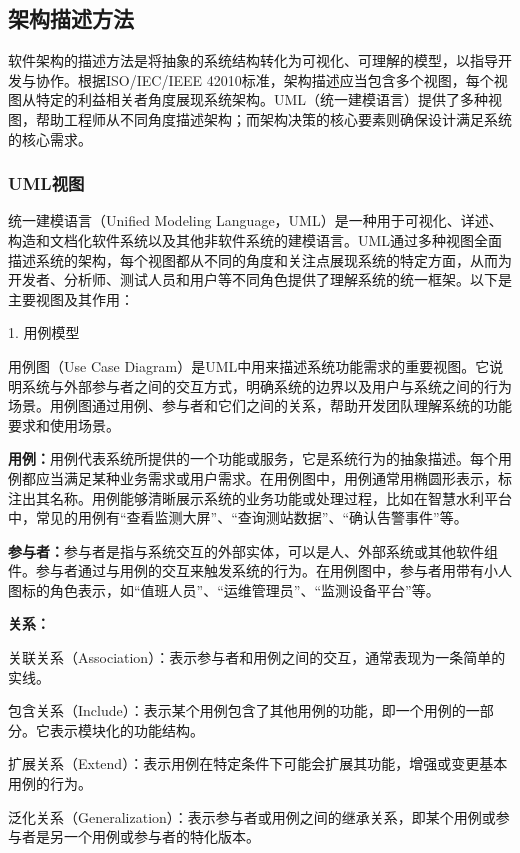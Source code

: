 \subsection{架构描述方法}

软件架构的描述方法是将抽象的系统结构转化为可视化、可理解的模型，以指导开发与协作\cite{clements2010}。根据ISO/IEC/IEEE 42010标准，架构描述应当包含多个视图，每个视图从特定的利益相关者角度展现系统架构\cite{ISO42010}。UML（统一建模语言）提供了多种视图，帮助工程师从不同角度描述架构；而架构决策的核心要素则确保设计满足系统的核心需求。

\subsubsection{UML视图}
统一建模语言（Unified Modeling Language，UML）是一种用于可视化、详述、构造和文档化软件系统以及其他非软件系统的建模语言。UML通过多种视图全面描述系统的架构，每个视图都从不同的角度和关注点展现系统的特定方面，从而为开发者、分析师、测试人员和用户等不同角色提供了理解系统的统一框架。以下是主要视图及其作用：

1. 用例模型

用例图（Use Case Diagram）是UML中用来描述系统功能需求的重要视图。它说明系统与外部参与者之间的交互方式，明确系统的边界以及用户与系统之间的行为场景。用例图通过用例、参与者和它们之间的关系，帮助开发团队理解系统的功能要求和使用场景。

\textbf{用例：}用例代表系统所提供的一个功能或服务，它是系统行为的抽象描述。每个用例都应当满足某种业务需求或用户需求。在用例图中，用例通常用椭圆形表示，标注出其名称。用例能够清晰展示系统的业务功能或处理过程，比如在智慧水利平台中，常见的用例有“查看监测大屏”、“查询测站数据”、“确认告警事件”等。

\textbf{参与者：}参与者是指与系统交互的外部实体，可以是人、外部系统或其他软件组件。参与者通过与用例的交互来触发系统的行为。在用例图中，参与者用带有小人图标的角色表示，如“值班人员”、“运维管理员”、“监测设备平台”等。

\textbf{关系：}

关联关系（Association）：表示参与者和用例之间的交互，通常表现为一条简单的实线。

包含关系（Include）：表示某个用例包含了其他用例的功能，即一个用例的一部分。它表示模块化的功能结构。

扩展关系（Extend）：表示用例在特定条件下可能会扩展其功能，增强或变更基本用例的行为。

泛化关系（Generalization）：表示参与者或用例之间的继承关系，即某个用例或参与者是另一个用例或参与者的特化版本。

